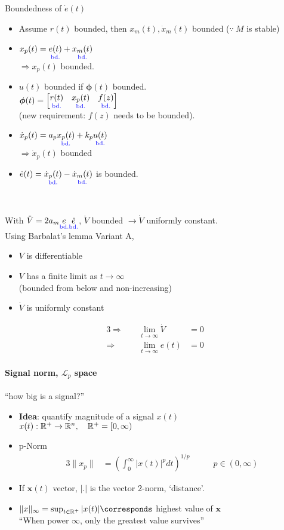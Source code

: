 Boundedness of $\dot{e}(t)$ 
\begin{itemize}
\item Assume $r(t)$ bounded, then
    $x_m(t), \dot{x}_m(t)$ bounded ($\because~ M$ is stable)
\item $x_p(t) = \underset{\textnormal{\color{blue}bd.}}{e(t)} + \underset{\textnormal{\color{blue}bd.}}{x_m(t)}$\\
    $\Rightarrow x_p(t)$ bounded.
\item $u(t)$ bounded if $\bm{\phi}(t)$ bounded.\\
    $\bm{\phi}(t) = \begin{bmatrix}\underset{\textnormal{\color{blue}bd.}}{r(t)} & \underset{\textnormal{\color{blue}bd.}}{x_p(t)} & \underset{\textnormal{\color{blue}bd.}}{f(z)}\end{bmatrix}$\\
    (new requirement: $f(z)$ needs to be bounded).
\item $\dot{x}_p(t) = a_p \underset{\textnormal{\color{blue}bd.}}{x_p(t)} + k_p \underset{\textnormal{\color{blue}bd.}}{u(t)}$\\
    $\Rightarrow \dot{x}_p(t)$ bounded\\
\item $\dot{e}(t) = \underset{\textnormal{\color{blue}bd.}}{\dot{x}_p(t)} - \underset{\textnormal{\color{blue}bd.}}{\dot{x}_m(t)}$
    is bounded.
\end{itemize}~

With $\ddot{V} = 2 a_m \underset{\textnormal{\color{blue}bd.}}{e} \underset{\textnormal{\color{blue}bd.}}{\dot{e}}$,
$\ddot{V}$ bounded $\rightarrow \dot{V}$ uniformly constant.\\

Using Barbalat's lemma Variant A,
\begin{itemize}
\item $V$ is differentiable
\item $V$ has a finite limit as $t \rightarrow \infty$ \\
    (bounded from below and non-increasing)
\item $\dot{V}$ is uniformly constant
\end{itemize}
\begin{alignat*}{3}
\Rightarrow& ~ & \lim_{t \rightarrow \infty} \dot{V} &= 0\\
\Rightarrow& ~ & \lim_{t \rightarrow \infty} e(t) &= 0
\end{alignat*}

\paragraph{Signal norm, $\mathcal{L}_p$ space}
``how big is a signal?''
\begin{itemize}
\item \textbf{Idea}: quantify magnitude of a signal $x(t)$\\
    $x(t): \mathbb{R}^+ \rightarrow \mathbb{R}^n, \quad \mathbb{R}^+ = [0, \infty)$
\item p-Norm
    \begin{alignat*}{3}
    \|x_p\| &= \left( \int_0^\infty |x(t)|^p dt \right)^{1/p}
        & \qquad p \in (0, \infty)
    \end{alignat*}
\item If $\bm{x}(t)$ vector, $|.|$ is the vector 2-norm,
    `distance'.
\item $\|x\|_\infty = \sup_{t \in \R^+} |x(t)| \corresponds$ 
    highest value of $\bm{x}$\\
    ``When power $\infty$, only the greatest value survives''
\end{itemize}

